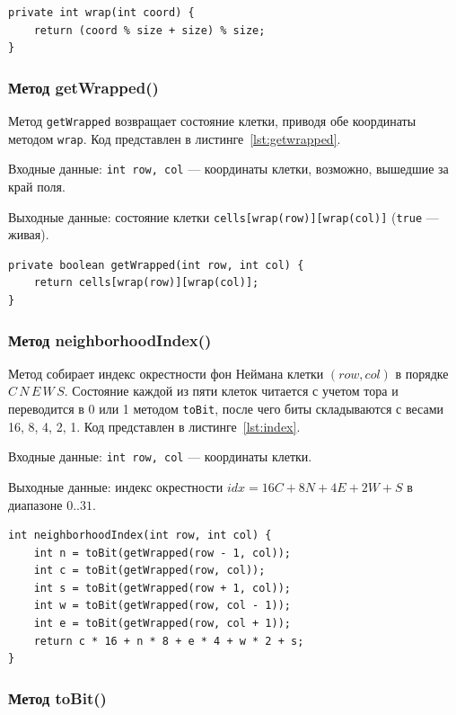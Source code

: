 \documentclass[a4paper,14pt]{extarticle}
\begin{document}
\begin{lstlisting}[caption={Метод wrap()}, label={lst:wrap}]
private int wrap(int coord) {
	return (coord % size + size) % size;
}
\end{lstlisting}

\subsubsection*{Метод getWrapped()}

Метод \texttt{getWrapped} возвращает состояние клетки, приводя обе координаты методом \texttt{wrap}. Код представлен в листинге~\ref{lst:getwrapped}.

Входные данные: \texttt{int row, col} --- координаты клетки, возможно, вышедшие за край поля.

Выходные данные: состояние клетки \texttt{cells[wrap(row)][wrap(col)]} (\texttt{true} --- живая).

\begin{lstlisting}[caption={Метод getWrapped()}, label={lst:getwrapped}]
private boolean getWrapped(int row, int col) {
	return cells[wrap(row)][wrap(col)];
}
\end{lstlisting}

\subsubsection*{Метод neighborhoodIndex()}

Метод собирает индекс окрестности фон Неймана клетки $(row, col)$ в порядке $C\,N\,E\,W\,S$. Состояние каждой из пяти клеток читается с учетом тора и переводится в 0 или 1 методом \texttt{toBit}, после чего биты складываются с весами 16, 8, 4, 2, 1. Код представлен в листинге~\ref{lst:index}.

Входные данные: \texttt{int row, col} --- координаты клетки.

Выходные данные: индекс окрестности $idx = 16C + 8N + 4E + 2W + S$ в диапазоне $0..31$.

\begin{lstlisting}[caption={Метод neighborhoodIndex()}, label={lst:index}]
int neighborhoodIndex(int row, int col) {
	int n = toBit(getWrapped(row - 1, col));
	int c = toBit(getWrapped(row, col));
	int s = toBit(getWrapped(row + 1, col));
	int w = toBit(getWrapped(row, col - 1));
	int e = toBit(getWrapped(row, col + 1));
	return c * 16 + n * 8 + e * 4 + w * 2 + s;
}
\end{lstlisting}

\subsubsection*{Метод toBit()}
\end{document}
